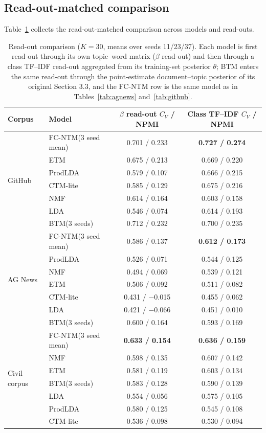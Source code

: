 \documentclass[11pt]{article}
\newcommand{\fcntm}{FC-NTM}
\begin{document}
\subsection{Read-out-matched comparison}

Table~\ref{tab:fair} collects the read-out-matched comparison across models and read-outs.

\begin{table}[t]
\centering
\caption{Read-out comparison ($K=30$, means over seeds 11/23/37). Each model is first read out through its own topic--word matrix ($\beta$ read-out) and then through a class TF--IDF read-out aggregated from its training-set posterior $\theta$; BTM enters the same read-out through the point-estimate document--topic posterior of its original Section 3.3, and the FC-NTM row is the same model as in Tables~\ref{tab:agnews} and~\ref{tab:github}.}
\label{tab:fair}
\footnotesize
\setlength{\tabcolsep}{4pt}
\begin{tabular}{@{}llcc@{}}
\toprule
Corpus & Model & $\beta$ read-out $C_V$ / NPMI & Class TF--IDF $C_V$ / NPMI \\
\midrule
 \multirow{7}{*}{GitHub}
 & \fcntm{}(3 seed mean) & 0.701 / 0.233 & \textbf{0.727 / 0.274} \\
 & ETM & 0.675 / 0.213 & 0.669 / 0.220 \\
 & ProdLDA & 0.579 / 0.107 & 0.666 / 0.215 \\
 & CTM-lite & 0.585 / 0.129 & 0.675 / 0.216 \\
 & NMF & 0.614 / 0.164 & 0.603 / 0.158 \\
 & LDA & 0.546 / 0.074 & 0.614 / 0.193 \\
 & BTM(3 seeds) & 0.712 / 0.232 & 0.700 / 0.235 \\
\midrule
 \multirow{7}{*}{AG News}
 & \fcntm{}(3 seed mean) & 0.586 / 0.137 & \textbf{0.612 / 0.173} \\
 & ProdLDA & 0.526 / 0.071 & 0.544 / 0.125 \\
 & NMF & 0.494 / 0.069 & 0.539 / 0.121 \\
 & ETM & 0.506 / 0.092 & 0.511 / 0.082 \\
 & CTM-lite & 0.431 / $-$0.015 & 0.455 / 0.062 \\
 & LDA & 0.421 / $-$0.066 & 0.451 / 0.010 \\
 & BTM(3 seeds) & 0.600 / 0.164 & 0.593 / 0.169 \\
\midrule
 \multirow{7}{*}{Civil corpus}
 & \fcntm{}(3 seed mean) & \textbf{0.633 / 0.154} & \textbf{0.636 / 0.159} \\
 & NMF & 0.598 / 0.135 & 0.607 / 0.142 \\
 & ETM & 0.581 / 0.119 & 0.603 / 0.134 \\
 & BTM(3 seeds) & 0.583 / 0.128 & 0.590 / 0.139 \\
 & LDA & 0.554 / 0.056 & 0.575 / 0.105 \\
 & ProdLDA & 0.580 / 0.125 & 0.545 / 0.108 \\
 & CTM-lite & 0.536 / 0.098 & 0.530 / 0.094 \\
\bottomrule
\end{tabular}
\end{table}
\end{document}
